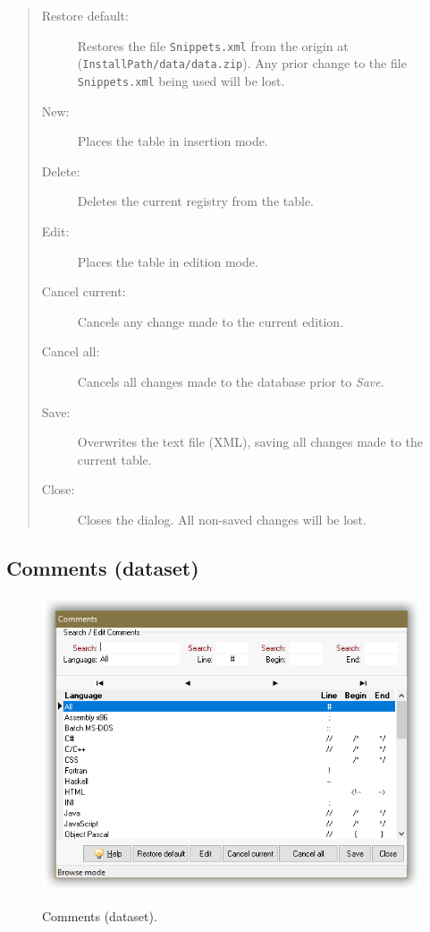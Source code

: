 \begin{quote}
  \begin{footnotesize}
    \begin{description}
      \item[Restore default:]
        Restores the file \texttt{Snippets.xml} from the origin at
        (\texttt{InstallPath/data/data.zip}). Any prior change to the file
        \texttt{Snippets.xml} being used will be lost.
      \item[New:]
        Places the table in insertion mode.
      \item[Delete:]
        Deletes the current registry from the table.
      \item[Edit:]
        Places the table in edition mode.
      \item[Cancel current:]
        Cancels any change made to the current edition.
      \item[Cancel all:]
        Cancels all changes made to the database prior to \textit{Save}.
      \item[Save:]
        Overwrites the text file (XML), saving all changes made to the current table.
      \item[Close:]
        Closes the dialog. All non-saved changes will be lost.
    \end{description}
  \end{footnotesize}
\end{quote}


\subsection{Comments (dataset)}

\begin{figure}[H]
  \includegraphics[scale=0.35]{./res/dlg_comments.png}\\
  \caption{Comments (dataset).}
  \label{fig:dlg_comments}
\end{figure}

